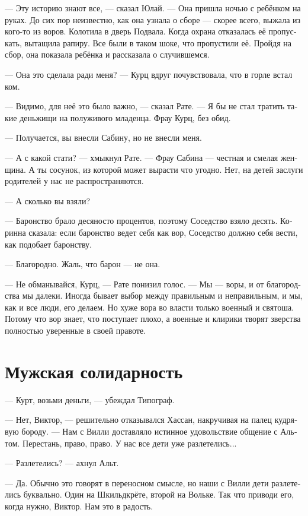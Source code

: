 \documentclass[a4paper,12pt,fleqn]{book}\usepackage{cooltooltips}\usepackage{polyglossia}\setdefaultlanguage[babelshorthands=true]{russian}\setotherlanguage{english}\defaultfontfeatures{Ligatures=TeX,Mapping=tex-text} \usepackage{xcolor}\definecolor{lightgray}{HTML}{bbbbbb}\color{lightgray}\newcommand{\ml}[3]{\textenglish{\textcolor{black}{#3}}}
\begin{document}
--- Эту историю знают все, --- сказал Юлай.
--- Она пришла ночью с ребёнком на руках.
До сих пор неизвестно, как она узнала о сборе --- скорее всего, выжала из кого-то из воров.
Колотила в дверь Подвала.
Когда охрана отказалась её пропускать, вытащила рапиру.
Все были в таком шоке, что пропустили её.
Пройдя на сбор, она показала ребёнка и рассказала о случившемся.

--- Она это сделала ради меня? --- Курц вдруг почувствовала, что в горле встал ком.

--- Видимо, для неё это было важно, --- сказал Рате.
--- Я бы не стал тратить такие деньжищи на полуживого младенца.
Фрау Курц, без обид.

--- Получается, вы внесли Сабину, но не внесли меня.

--- А с какой стати? --- хмыкнул Рате.
--- Фрау Сабина --- честная и смелая женщина.
А ты сосунок, из которой может вырасти что угодно.
Нет, на детей заслуги родителей у нас не распространяются.

--- А сколько вы взяли?

--- Баронство брало десяносто процентов, поэтому Соседство взяло десять.
Коринна сказала: если баронство ведет себя как вор, Соседство должно себя вести, как подобает баронству.

--- Благородно.
Жаль, что барон — не она.

--- Не обманывайся, Курц, --- Рате понизил голос.
--- Мы --- воры, и от благородства мы далеки.
Иногда бывает выбор между правильным и неправильным, и мы, как и все люди, его делаем.
Но хуже вора во власти только военный и святоша.
Потому что вор знает, что поступает плохо, а военные и клирики творят зверства полностью уверенные в своей правоте.

\section{Мужская солидарность}

--- Курт, возьми деньги, --- убеждал Типограф.

--- Нет, Виктор, --- решительно отказывался Хассан, накручивая на палец кудрявую бороду.
--- Нам с Вилли доставляло истинное удовольствие общение с Альтом.
Перестань, право, право.
У нас все дети уже разлетелись...

--- Разлетелись? --- ахнул Альт.

--- Да.
Обычно это говорят в переносном смысле, но наши с Вилли дети разлетелись буквально.
Один на Шкильдкрёте, второй на Вольке.
Так что приводи его, когда нужно, Виктор.
Нам это в радость.
\end{document}
